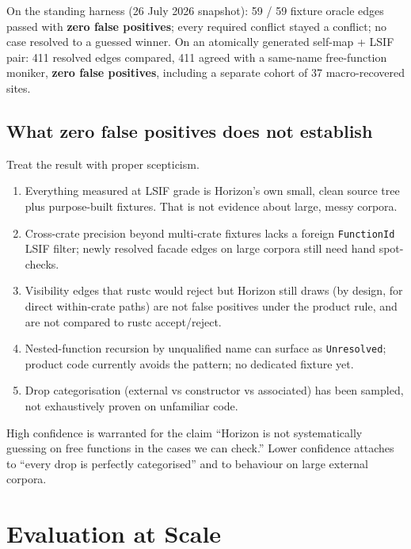 \documentclass[11pt,a4paper,oneside]{report}
\newcommand{\horizon}{Horizon}
\begin{document}
On the standing harness (26 July 2026 snapshot): 59 / 59 fixture oracle edges
passed with \textbf{zero false positives}; every required conflict stayed a
conflict; no case resolved to a guessed winner. On an atomically generated
self-map + LSIF pair: 411 resolved edges compared, 411 agreed with a
same-name free-function moniker, \textbf{zero false positives}, including a
separate cohort of 37 macro-recovered sites.

\section{What zero false positives does not establish}

Treat the result with proper scepticism.

\begin{enumerate}[nosep]
  \item Everything measured at LSIF grade is \horizon{}'s own small, clean
    source tree plus purpose-built fixtures. That is not evidence about large,
    messy corpora.
  \item Cross-crate precision beyond multi-crate fixtures lacks a foreign
    \texttt{FunctionId} LSIF filter; newly resolved facade edges on large
    corpora still need hand spot-checks.
  \item Visibility edges that rustc would reject but \horizon{} still draws
    (by design, for direct within-crate paths) are not false positives under
    the product rule, and are not compared to rustc accept/reject.
  \item Nested-function recursion by unqualified name can surface as
    \texttt{Unresolved}; product code currently avoids the pattern; no
    dedicated fixture yet.
  \item Drop categorisation (external vs constructor vs associated) has been
    sampled, not exhaustively proven on unfamiliar code.
\end{enumerate}

High confidence is warranted for the claim ``\horizon{} is not systematically
guessing on free functions in the cases we can check.'' Lower confidence
attaches to ``every drop is perfectly categorised'' and to behaviour on large
external corpora.

\chapter{Evaluation at Scale}
\label{ch:scale}
\end{document}
